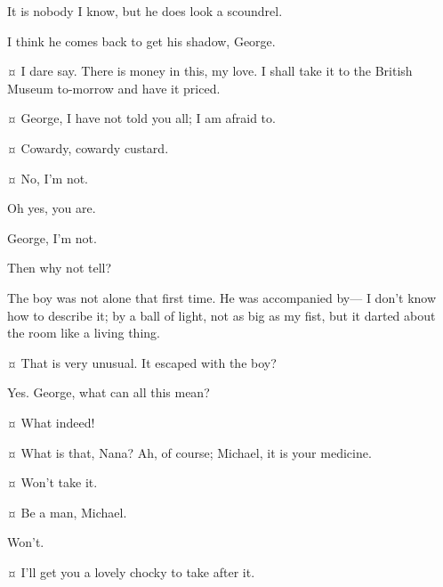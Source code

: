 \begin{drama}
\mrdarlingspeaks
It is nobody I know, but he does look a scoundrel.

\mrsdarlingspeaks
I think he comes back to get his shadow, George.

\mrdarlingspeaks {}¤
I dare say.
There is money in this, my love.
I shall take it to the British Museum to-morrow and have it priced.


\mrsdarlingspeaks {}¤
George, I have not told you all; I am afraid to.

\mrdarlingspeaks {}¤
Cowardy, cowardy custard.

\mrsdarlingspeaks {}¤
No, I'm not.

\mrdarlingspeaks
Oh yes, you are.

\mrsdarlingspeaks
George, I'm not.

\mrdarlingspeaks
Then why not tell?

\mrsdarlingspeaks
The boy was not alone that first time.
He was accompanied by—%
I don't know how to describe it;
by a ball of light, not as big as my fist, but it darted about the room like a living thing.

\mrdarlingspeaks {}¤
That is very unusual.
It escaped with the boy?

\mrsdarlingspeaks
Yes.
George, what can all this mean?

\mrdarlingspeaks {}¤
What indeed!


\mrsdarlingspeaks {}¤
What is that, Nana?
Ah, of course; Michael, it is your medicine.

\michaelspeaks {}¤
Won't take it.

\mrdarlingspeaks {}¤
Be a man, Michael.

\michaelspeaks
Won't.

\mrsdarlingspeaks {}¤
I'll get you a lovely chocky to take after it.


\end{drama}
